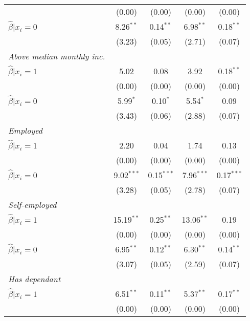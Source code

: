 \begin{table}[htbp]
{\begin{threeparttable}
\begin{tabular}{l*{4}{c}}
                &   (0.00)&   (0.00)&   (0.00)&   (0.00)\\
\hspace{0.5cm} \(\hat\beta|x_i=0\)&8.26$^{**}$&0.14$^{**}$&6.98$^{**}$&0.18$^{**}$\\
                &   (3.23)&   (0.05)&   (2.71)&   (0.07)\\
\textit{Above median monthly inc.}&         &         &         &         \\
\hspace{0.5cm} \(\hat\beta|x_i=1\)&     5.02&     0.08&     3.92&0.18$^{**}$\\
                &   (0.00)&   (0.00)&   (0.00)&   (0.00)\\
\hspace{0.5cm} \(\hat\beta|x_i=0\)&5.99$^{*}$&0.10$^{*}$&5.54$^{*}$&     0.09\\
                &   (3.43)&   (0.06)&   (2.88)&   (0.07)\\
\textit{Employed}&         &         &         &         \\
\hspace{0.5cm} \(\hat\beta|x_i=1\)&     2.20&     0.04&     1.74&     0.13\\
                &   (0.00)&   (0.00)&   (0.00)&   (0.00)\\
\hspace{0.5cm} \(\hat\beta|x_i=0\)&9.02$^{***}$&0.15$^{***}$&7.96$^{***}$&0.17$^{***}$\\
                &   (3.28)&   (0.05)&   (2.78)&   (0.07)\\
\textit{Self-employed}&         &         &         &         \\
\hspace{0.5cm} \(\hat\beta|x_i=1\)&15.19$^{**}$&0.25$^{**}$&13.06$^{**}$&     0.19\\
                &   (0.00)&   (0.00)&   (0.00)&   (0.00)\\
\hspace{0.5cm} \(\hat\beta|x_i=0\)&6.95$^{**}$&0.12$^{**}$&6.30$^{**}$&0.14$^{**}$\\
                &   (3.07)&   (0.05)&   (2.59)&   (0.07)\\
\textit{Has dependant}&         &         &         &         \\
\hspace{0.5cm} \(\hat\beta|x_i=1\)&6.51$^{**}$&0.11$^{**}$&5.37$^{**}$&0.17$^{**}$\\
                &   (0.00)&   (0.00)&   (0.00)&   (0.00)\\

\end{tabular}
\end{threeparttable}}
\end{table}
